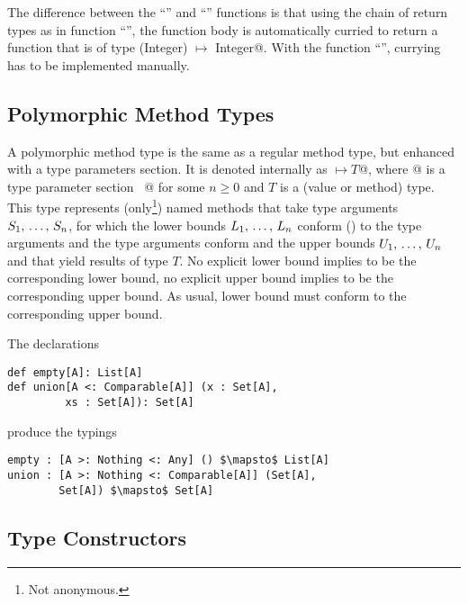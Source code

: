 The difference between the ``'' and ``'' functions is that using the chain of return types as in function ``'', the function body is automatically curried to return a function that is of type \lstinline@(Integer) $\mapsto$ Integer@. With the function ``'', currying has to be implemented manually. 






\subsection{Polymorphic Method Types}
\label{sec:polymorphic-method-types}

A polymorphic method type is the same as a regular method type, but enhanced with a type parameters section. It is denoted internally as \lstinline@[$\tps$]$ \mapsto T$@, where \lstinline@[$\tps$]@ is a type parameter section ~\lstinline@[$\pm a_1$ >: $L_1$ <: $U_1$ $\commadots$ $\pm a_n$ >: $L_n$ <: $U_n$]@ for some $n \geq 0$ and $T$ is a (value or method) type. This type represents (only\footnote{Not anonymous.}) named methods that take type arguments $S_1 ,\, \ldots ,\, S_n$, for which the lower bounds $L_1 ,\, \ldots ,\, L_n$ conform () to the type arguments and the type arguments conform and the upper bounds $U_1 ,\, \ldots ,\, U_n$ and that yield results of type $T$. No explicit lower bound implies  to be the corresponding lower bound, no explicit upper bound implies  to be the corresponding upper bound. As usual, lower bound must conform to the corresponding upper bound. 

\example The declarations
\begin{lstlisting}[escapechar=@,deletekeywords={union}]
def empty[A]: List[A]
def union[A <: Comparable[A]] (x : Set[A], 
         xs : Set[A]): Set[A]
\end{lstlisting}
produce the typings
\begin{lstlisting}[escapechar=@,deletekeywords={union}]
empty : [A >: Nothing <: Any] () $\mapsto$ List[A]
union : [A >: Nothing <: Comparable[A]] (Set[A], 
        Set[A]) $\mapsto$ Set[A]
\end{lstlisting}






\subsection{Type Constructors}
\label{sec:type-constructors}

